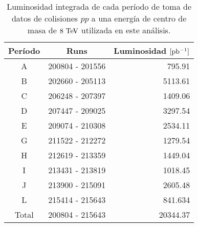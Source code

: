 \begin{table}[!htbp]
  \centering
  \caption{Luminosidad integrada de cada período de toma de datos de colisiones
    $pp$ a una energía de centro de masa de $8 \tev$ utilizada en este
    análisis.}
  \label{tab:data_periods}

  \begin{tabular}{ccr}
    \hline
    Período & Runs & Luminosidad $[\mbox{pb$^{-1}$}]$ \\
    \hline
    A & 200804 - 201556 & 795.91 \\
    B & 202660 - 205113 & 5113.61 \\
    C & 206248 - 207397 & 1409.06 \\
    D & 207447 - 209025 & 3297.54 \\
    E & 209074 - 210308 & 2534.11 \\
    G & 211522 - 212272 & 1279.54 \\
    H & 212619 - 213359 & 1449.04 \\
    I & 213431 - 213819 & 1018.45 \\
    J & 213900 - 215091 & 2605.48 \\
    L & 215414 - 215643 & 841.634 \\
    \hline
    Total & 200804 - 215643 & 20344.37 \\
    \hline
  \end{tabular}

\end{table}





